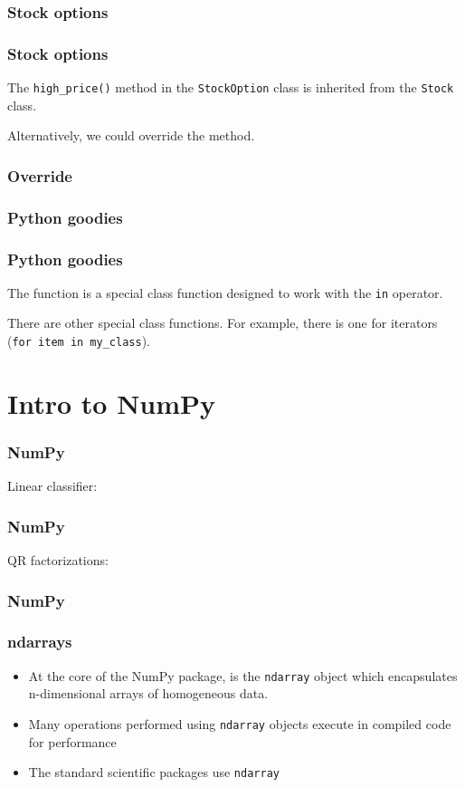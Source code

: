 \documentclass{beamer}
\begin{document}
\begin{frame}
\frametitle{Stock options}
\end{frame}

\begin{frame}
\frametitle{Stock options}
The \texttt{high\_price()} method in the \texttt{StockOption} class is inherited from the \texttt{Stock} class.

\vspace{0.2in}
Alternatively, we could override the method.
\end{frame}

\begin{frame}
\frametitle{Override}
\end{frame}

\begin{frame}
\frametitle{Python goodies}
\end{frame}

\begin{frame}
\frametitle{Python goodies}
The  function is a special class function designed to work with the \texttt{in} operator.

\vspace{0.2in}

There are other special class functions.  For example, there is one for iterators (\texttt{for item in my\_class}).

\end{frame}


\section{Intro to NumPy}

\begin{frame}
\frametitle{NumPy}
\end{frame}


\begin{frame}
Linear classifier:
\frametitle{NumPy}
\end{frame}


\begin{frame}
QR factorizations:
\frametitle{NumPy}
\end{frame}


\begin{frame}
\frametitle{ndarrays}

\begin{itemize}
\setlength{\itemsep}{0.1in}
\item{At the core of the NumPy package, is the \texttt{ndarray} object which encapsulates n-dimensional arrays of homogeneous data. 
}
\item{Many operations performed using \texttt{ndarray} objects execute in compiled code for performance}
\item{The standard scientific packages use \texttt{ndarray}}
\end{itemize}
\end{frame}
\end{document}
